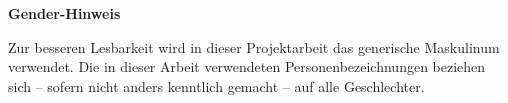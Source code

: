 \textbf{Gender-Hinweis}

Zur besseren Lesbarkeit wird in dieser Projektarbeit das generische Maskulinum verwendet. Die in dieser Arbeit verwendeten Personenbezeichnungen beziehen sich – sofern nicht anders kenntlich gemacht – auf alle Geschlechter.